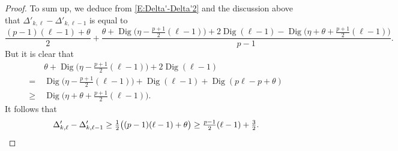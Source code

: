 \documentclass[12pt]{amsart}
\theoremstyle{definition}
\numberwithin{equation}{subsection}
\DeclareMathOperator{\Dig}{Dig}
\begin{document}
\begin{proof}
To sum up, we deduce from \eqref{E:Delta'-Delta'2} and the discussion above that $\Delta'_{k, \ell} - \Delta'_{k, \ell-1}$ is equal to
\begin{equation}
\label{E:Delta'-Delta'3}
\frac {(p-1) (\ell-1) + \theta}2+ \frac{\theta + \Dig\big(\eta -\frac{p+1}2(\ell-1)\big) + 2\Dig(\ell-1) - \Dig\big(\eta +\theta+\frac{p+1}2(\ell-1)\big)}{p-1}.
\end{equation}
But it is clear that 
\begin{align}
\nonumber
&\theta + \Dig\big(\eta -\tfrac{p+1}2(\ell-1)\big) + 2\Dig(\ell-1)
\\
\nonumber
=\ &\Dig \big(\eta -\tfrac{p+1}2(\ell-1)\big) + \Dig(\ell-1) + \Dig (p\ell-p+\theta)
\\
\label{E:inequality in difference of delta} \geq\ & \Dig\big(\eta +\theta+\tfrac{p+1}2(\ell-1)\big).
\end{align}
It follows that
\[
\Delta'_{k, \ell} - \Delta'_{k, \ell-1} \geq \tfrac 12\big((p-1) (\ell-1) + \theta \big) \geq \tfrac{p-1}2(\ell-1) + \tfrac 32. \qedhere
\]
\end{proof}
\end{document}
